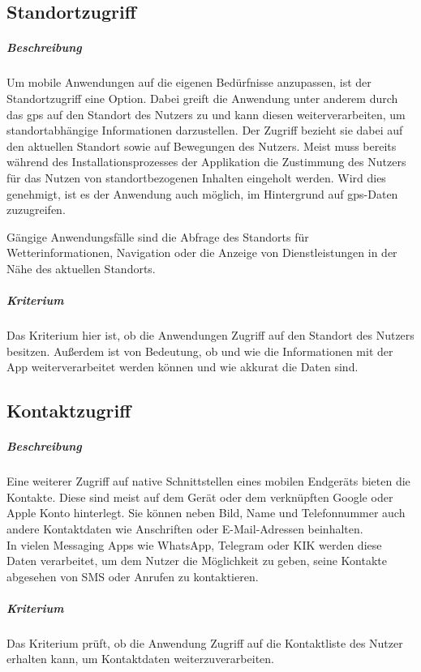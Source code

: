 \subsection{Standortzugriff}
\subparagraph{Beschreibung\\}
Um mobile Anwendungen auf die eigenen Bedürfnisse anzupassen, ist der Standortzugriff eine Option.
Dabei greift die Anwendung unter anderem durch das \ac{gps} auf den Standort des Nutzers zu und kann diesen weiterverarbeiten, um standortabhängige Informationen darzustellen.
Der Zugriff bezieht sie dabei auf den aktuellen Standort sowie auf Bewegungen des Nutzers.
Meist muss bereits während des Installationsprozesses der Applikation die Zustimmung des Nutzers für das Nutzen von standortbezogenen Inhalten eingeholt werden.
Wird dies genehmigt, ist es der Anwendung auch möglich, im Hintergrund auf \ac{gps}-Daten zuzugreifen.

Gängige Anwendungsfälle sind die Abfrage des Standorts für Wetterinformationen, Navigation oder die Anzeige von Dienstleistungen in der Nähe des aktuellen Standorts.

\subparagraph{Kriterium\\}
Das Kriterium hier ist, ob die Anwendungen Zugriff auf den Standort des Nutzers besitzen.
Außerdem ist von Bedeutung, ob und wie die Informationen mit der App weiterverarbeitet werden können und wie akkurat die Daten sind. 

\subsection{Kontaktzugriff}
\subparagraph{Beschreibung\\}
Eine weiterer Zugriff auf native Schnittstellen eines mobilen Endgeräts bieten die Kontakte.
Diese sind meist auf dem Gerät oder dem verknüpften Google oder Apple Konto hinterlegt.
Sie können neben Bild, Name und Telefonnummer auch andere Kontaktdaten wie Anschriften oder E-Mail-Adressen beinhalten.\\
In vielen Messaging Apps wie WhatsApp, Telegram oder KIK werden diese Daten verarbeitet, um dem Nutzer die Möglichkeit zu geben, seine Kontakte abgesehen von SMS oder Anrufen zu kontaktieren.

\subparagraph{Kriterium\\}
Das Kriterium prüft, ob die Anwendung Zugriff auf die Kontaktliste des Nutzer erhalten kann, um Kontaktdaten weiterzuverarbeiten.

